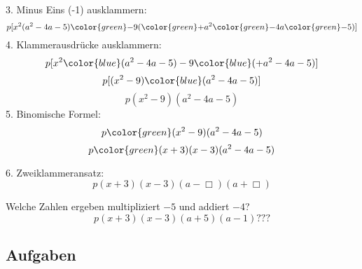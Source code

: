 3. Minus Eins (-1) ausklammern:
$$p[x^2 (a^2 -4a -5) {\color{green}-} 9({\color{green}+}a^2 {\color{green}-} 4a {\color{green}-} 5)]$$
4. Klammerausdrücke ausklammern:
$$p[x^2 {\color{blue}(a^2 -4a -5)} - 9{\color{blue}(+a^2 - 4a - 5)}]$$
$$p[(x^2-9) {\color{blue}(a^2 -4a -5)}]$$
$$p(x^2-9) (a^2 -4a -5)$$
5. Binomische Formel:
$$p{\color{green}(x^2-9)}(a^2 -4a -5)$$
$$p{\color{green}(x+3)(x-3)}(a^2 -4a -5)$$

6. Zweiklammeransatz:
$$p(x+3)(x-3) (a-\Box{})(a+\Box{})$$

Welche Zahlen ergeben multipliziert $-5$ und addiert $-4$?
$$p(x+3)(x-3)(a+5)(a-1) ???$$
\begin{center}{}\end{center}


\subsection*{Aufgaben}


